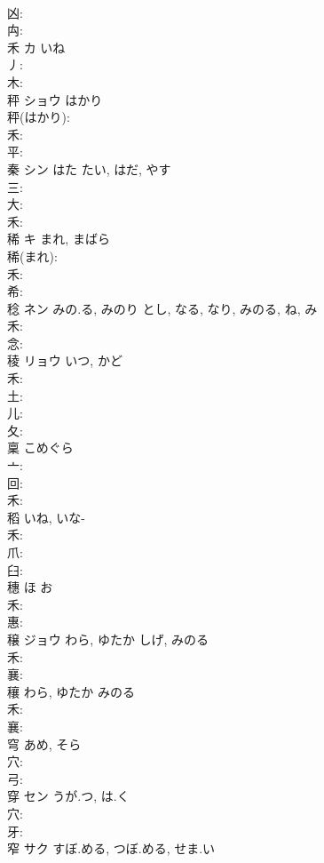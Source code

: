 \documentclass[8pt]{extreport}
\begin{document}
\begin{CJK}{UTF8}{min}
\\	凶: 
\\	禸: 
\\	禾	カ	いね		
\\	丿: 
\\	木: 
\\	秤	ショウ	はかり		
\\	秤(はかり): 
\\	禾: 
\\	平: 
\\	秦	シン	はた	たい, はだ, やす	
\\	三: 
\\	大: 
\\	禾: 
\\	稀	キ	まれ, まばら		
\\	稀(まれ): 
\\	禾: 
\\	希: 
\\	稔	ネン	みの.る, みのり	とし, なる, なり, みのる, ね, み	
\\	禾: 
\\	念: 
\\	稜	リョウ	いつ, かど		
\\	禾: 
\\	土: 
\\	儿: 
\\	夂: 
\\	稟		こめぐら				
\\	亠: 
\\	回: 
\\	禾: 
\\	稻		いね, いな-				
\\	禾: 
\\	爪: 
\\	臼: 
\\	穗		ほ	お			
\\	禾: 
\\	惠: 
\\	穣	ジョウ	わら, ゆたか	しげ, みのる	
\\	禾: 
\\	襄: 
\\	穰		わら, ゆたか	みのる			
\\	禾: 
\\	襄: 
\\	穹		あめ, そら				
\\	穴: 
\\	弓: 
\\	穿	セン	うが.つ, は.く		
\\	穴: 
\\	牙: 
\\	窄	サク	すぼ.める, つぼ.める, せま.い		

\end{CJK}
\end{document}
